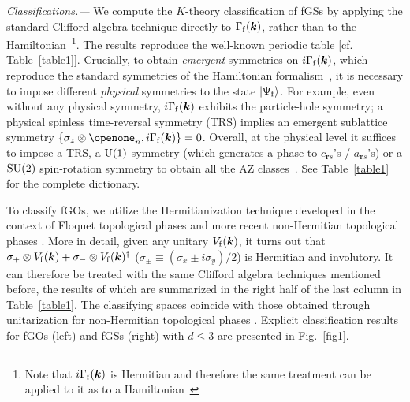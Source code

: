 \documentclass[prl,twocolumn,preprintnumbers,superscriptaddress,amsmath,amssymb]{revtex4-1}
\begin{document}
\emph{Classifications.---}
We compute the $K$-theory classification of fGSs by applying the standard Clifford algebra technique \cite{Kitaev2009} directly to $\Gamma_{\rm f}(\boldsymbol{k})$, rather than to the Hamiltonian~\footnote{Note that $i\Gamma_{\rm f}(\boldsymbol{k})$ is Hermitian and %
therefore the same treatment can be applied to it as to a Hamiltonian~\cite{SM}}. The results reproduce the well-known periodic table \cite{Ryu2008,Kitaev2009,Ryu2010} [cf. Table~\ref{table1}]. Crucially, to obtain \emph{emergent} symmetries on $i\Gamma_{\rm f}(\boldsymbol{k})$, which reproduce the standard symmetries of the Hamiltonian formalism~\cite{Ryu2016},
it is necessary to impose different \emph{physical} symmetries to the state $\ket{\Psi_{\rm f}}$.
For example, even without any physical symmetry, $i\Gamma_{\rm f}(\boldsymbol{k})$ exhibits the particle-hole symmetry; a physical spinless time-reversal symmetry (TRS) implies an emergent sublattice symmetry $\{\sigma_z\otimes\openone_n, i\Gamma_{\rm f}(\boldsymbol{k})\}=0$.
Overall, at the physical level it suffices to impose a TRS, a ${\rm U}(1)$ symmetry (which generates a phase to $c_{\boldsymbol{r}s}$'s / $a_{\boldsymbol{r}s}$'s) or a ${\rm SU}(2)$ spin-rotation symmetry to obtain all the AZ classes~\cite{Altland1997,Ryu2008}. See Table~\ref{table1} for the complete dictionary. 


To classify fGOs, we utilize the Hermitianization technique developed in the context of Floquet topological phases \cite{Harper2017} and more recent non-Hermitian topological phases \cite{Gong2018,Zhou2019,Kawabata2019}. More in detail, given any unitary $V_{\rm f}(\boldsymbol{k})$, it turns out that $\sigma_+\otimes V_{\rm f}(\boldsymbol{k})+\sigma_-\otimes V_{\rm f}(\boldsymbol{k})^\dag$ ($\sigma_\pm\equiv(\sigma_x\pm i\sigma_y)/2$) is Hermitian and involutory. It can therefore be treated with the same Clifford algebra techniques mentioned before, the results of which are summarized in the right half of the last column in Table~\ref{table1}. The classifying spaces coincide with those obtained through unitarization for non-Hermitian topological phases \cite{Gong2018}. Explicit classification results for fGOs (left) and fGSs (right) with $d\le 3$ are presented in Fig.~\ref{fig1}. 
\end{document}
